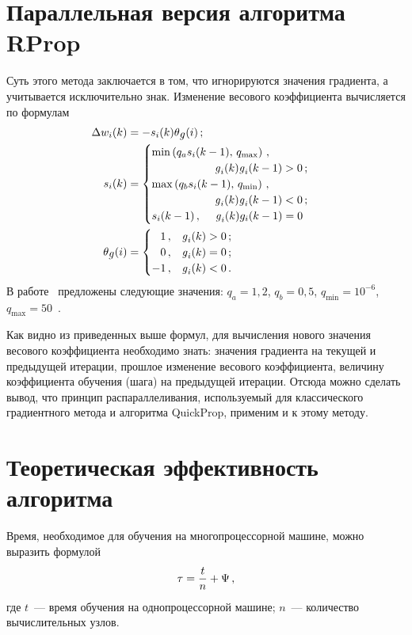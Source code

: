 \begin{multicols}{2}
\section{Параллельная версия алгоритма RProp}

 Суть этого метода заключается в том, что игнорируются значения градиента, а
учитывается исключительно знак. Изменение весового коэффициента вычисляется по
формулам~\cite{7kr, 9kr}
\begin{align*}
\Delta w_i(k) & =-s_i(k)\theta_{\g}(i)\,;\\
s_i(k) & =
\begin{cases}
\min \left( q_a s_i(k-1),\,q_{\max}\right)\,,\\
\hspace*{20mm} \g_i(k)\g_i(k-1)>0\,;\\
\max \left( q_b s_i(k-1),\,q_{\min}\right)\,, \\
\hspace*{20mm} \g_i(k)\g_i(k-1)<0\,;\\
s_i(k-1)\,, \quad \hspace{1mm}\g_i(k) g_i(k-1)=0
\end{cases}
\\
\theta_{\g}(i) &=
\begin{cases}
\hphantom{-}1\,, & \g_i(k)>0\,;\\
\hphantom{-}0\,, & \g_i(k)=0\,;\\
-1\,, & \g_i(k)<0\,.
\end{cases}
\end{align*}
В работе~\cite{4kr} предложены следующие значения: $q_a=1{,}2$, $q_b=0{,}5$,
$q_{\min} =10^{-6}$, $q_{\max}=50$~\cite{13kr}.

 Как видно из приведенных выше формул, для вычисления нового значения весового
коэффициента необходимо знать: значения градиента на текущей и предыдущей итерации,
прошлое изменение весового коэффициента, величину коэффициента обучения (шага) на
предыдущей итерации. Отсюда можно сделать вывод, что принцип распараллеливания,
используемый для классического градиентного метода и алгоритма QuickProp, применим и к
этому методу.

\section{Теоретическая эффективность алгоритма}

 Время, необходимое для обучения на многопроцессорной машине, можно выразить
формулой
 \begin{equation*}
 \tau = \displaystyle\frac{\displaystyle t\mathstrut}{\displaystyle n\mathstrut}+\Psi\,,
 \end{equation*}
где $t$~--- время обучения на однопроцессорной машине; $n$~--- количество
вычислительных узлов.


\end{multicols}
